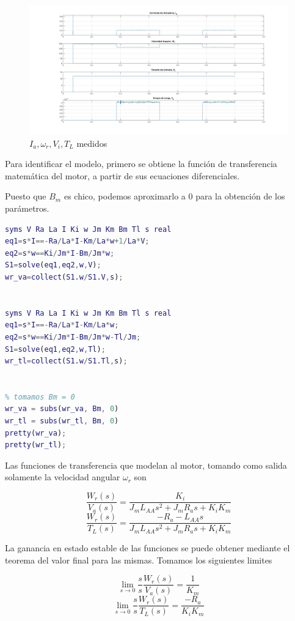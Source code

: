 \documentclass{article}
\begin{document}
\begin{figure}[!h]
  \centering
  \includegraphics[width=1\textwidth]{img/mot5-1.jpg}
  \caption{$I_a, \omega_r, V_i, T_L$ medidos}
\end{figure}

Para identificar el modelo, primero se obtiene la función de 
transferencia matemática del motor, a partir de sus ecuaciones diferenciales.

Puesto que $B_m$ es chico, podemos aproximarlo a 0 para la obtención de los parámetros.

\begin{lstlisting}[language=matlab]
%% Obtencion de la funcion de transferencia del motor
syms V Ra La I Ki w Jm Km Bm Tl s real
eq1=s*I==-Ra/La*I-Km/La*w+1/La*V;
eq2=s*w==Ki/Jm*I-Bm/Jm*w;
S1=solve(eq1,eq2,w,V);
wr_va=collect(S1.w/S1.V,s);


syms V Ra La I Ki w Jm Km Bm Tl s real
eq1=s*I==-Ra/La*I-Km/La*w;
eq2=s*w==Ki/Jm*I-Bm/Jm*w-Tl/Jm;
S1=solve(eq1,eq2,w,Tl);
wr_tl=collect(S1.w/S1.Tl,s);


% tomamos Bm = 0
wr_va = subs(wr_va, Bm, 0)
wr_tl = subs(wr_tl, Bm, 0)
pretty(wr_va);
pretty(wr_tl);  
\end{lstlisting}

Las funciones de transferencia que modelan al motor, tomando como salida solamente
la velocidad angular $\omega_r$ son

$$\frac{W_r(s)}{V_a(s)}=\frac{K_i}{J_mL_{AA}s^2+J_m R_as+K_iK_m}$$
$$\frac{W_r(s)}{T_L(s)}=\frac{-R_a-L_{AA}s}{J_mL_{AA}s^2+J_m R_as+K_iK_m}$$

La ganancia en estado estable de las funciones se puede obtener
mediante el teorema del valor final para las mismas. Tomamos los siguientes limites

\[ \lim_{s\to0} \frac{s}{s}\frac{W_r(s)}{V_a(s)} = \frac{1}{K_m}\]
\[ \lim_{s\to0} \frac{s}{s}\frac{W_r(s)}{T_L(s)} = \frac{-R_a}{K_iK_m}\]
\end{document}
